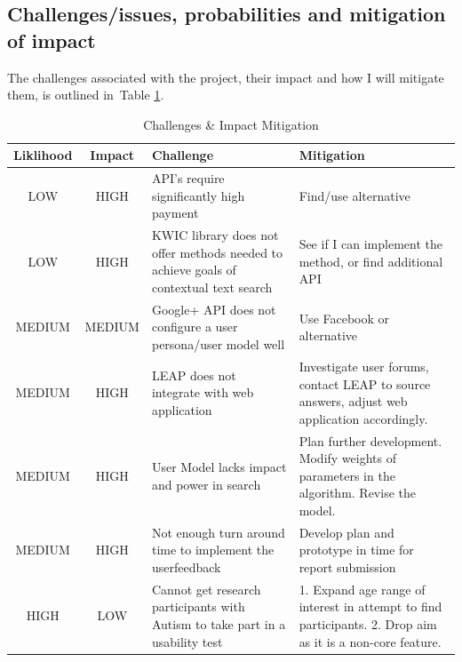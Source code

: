 \documentclass[a4paper, 10pt]{article}
\begin{document}
\subsection{Challenges/issues, probabilities and mitigation of impact}
The challenges associated with the project, their impact and how I will mitigate them, is outlined in~Table \ref{risks}. 
\begin{table}[H]
\caption{Challenges \& Impact Mitigation} 
\centering
\begin{tabular}{|c | c | p{6cm} | p{6cm} |}
\hline\hline 
Liklihood & Impact & Challenge & Mitigation\\ [0.5ex]
\hline 
LOW & HIGH & API's require significantly high payment & Find/use alternative\\
\hline 
LOW & HIGH & KWIC library does not offer methods needed to achieve goals of contextual text search & See if I can implement the method, or find additional API\\
\hline 
MEDIUM & MEDIUM & Google+ API does not configure a user persona/user model well & Use Facebook or alternative\\
\hline 
MEDIUM & HIGH & LEAP does not integrate with web application & Investigate user forums, contact LEAP to source answers, adjust web application accordingly.\\
\hline
MEDIUM & HIGH & User Model lacks impact and power in search & Plan further development. Modify weights of parameters in the algorithm. Revise the model. \\
\hline 
MEDIUM & HIGH & Not enough turn around time to implement the userfeedback & Develop plan and prototype in time for report submission\\
\hline
HIGH & LOW & Cannot get research participants with Autism to take part in a usability test & 1. Expand age range of interest in attempt to find participants. 2. Drop aim as it is a non-core feature.\\ 
\hline

\end{tabular}
\label{risks} 
\end{table}
\end{document}
